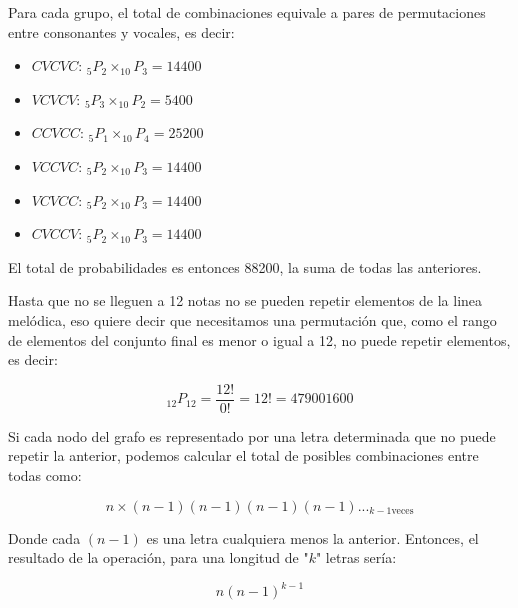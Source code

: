 \documentclass{article}
\begin{document}
Para cada grupo, el total de combinaciones equivale a pares de permutaciones entre consonantes y vocales, es decir:

\begin{itemize}
    \item $CVCVC$: $_5P_2 \times _{10}P_3 = 14400$
    \item $VCVCV$: $_5P_3 \times _{10}P_2 =  5400$
    \item $CCVCC$: $_5P_1 \times _{10}P_4 = 25200$
    \item $VCCVC$: $_5P_2 \times _{10}P_3 = 14400$
    \item $VCVCC$: $_5P_2 \times _{10}P_3 = 14400$
    \item $CVCCV$: $_5P_2 \times _{10}P_3 = 14400$
\end{itemize}

El total de probabilidades es entonces 88200, la suma de todas las anteriores.


Hasta que no se lleguen a 12 notas no se pueden repetir elementos de la linea melódica, eso quiere decir que necesitamos una permutación que, como el rango de elementos del conjunto final es menor o igual a 12, no puede repetir elementos, es decir:

$$_{12}P_{12} = \dfrac{12!}{0!} = 12! = 479001600$$



Si cada nodo del grafo es representado por una letra determinada que no puede repetir la anterior, podemos calcular el total de posibles combinaciones entre todas como:

$$n \times (n-1)(n-1)(n-1)(n-1)..._{k-1 \text{veces}}$$

Donde cada $(n-1)$ es una letra cualquiera menos la anterior. Entonces, el resultado de la operación, para una longitud de "$k$" letras sería:

$$n(n-1)^{k-1}$$
\end{document}
